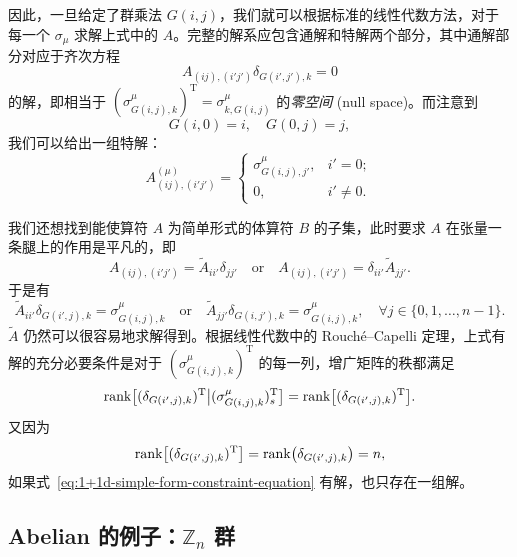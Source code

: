 因此，一旦给定了群乘法 $G(i,j)$，我们就可以根据标准的线性代数方法，对于每一个 $\sigma_\mu$ 求解上式中的 $A$。完整的解系应包含通解和特解两个部分，其中通解部分对应于齐次方程
\begin{equation}
  A_{(ij), (i'j')} \delta_{G(i',j'), k} = 0
\end{equation}
的解，即相当于 $(\sigma^\mu_{G(i,j),k})^{\mathrm{T}}=\sigma^\mu_{k,G(i,j)}$ 的\emph{零空间} (null space)。而注意到
\begin{equation}
  G(i,0) = i, \quad G(0,j) = j,
\end{equation}
我们可以给出一组特解：
\begin{equation}
  A^{(\mu)}_{(ij), (i'j')} = \begin{cases}
    \sigma^\mu_{G(i,j), j'}, & i' = 0; \\
    0, & i' \neq 0.
  \end{cases}
  \label{eq:1+1d-specific-solution}
\end{equation}

我们还想找到能使算符 $A$ 为简单形式的体算符 $B$ 的子集，此时要求 $A$ 在张量一条腿上的作用是平凡的，即
\begin{equation}
  A_{(ij), (i'j')} = \tilde{A}_{ii'} \delta_{jj'} \quad \text{or} \quad
  A_{(ij), (i'j')} = \delta_{ii'} \tilde{A}_{jj'}.
\end{equation}
于是有
\begin{equation}
  \tilde{A}_{ii'} \delta_{G(i',j), k} = \sigma^\mu_{G(i,j), k} \quad \text{or} \quad
  \tilde{A}_{jj'} \delta_{G(i,j'), k} = \sigma^\mu_{G(i,j), k}, \quad
  \forall j \in \{ 0, 1, \dots, n-1 \}.
  \label{eq:1+1d-simple-form-constraint-equation}
\end{equation}
$\tilde{A}$ 仍然可以很容易地求解得到。根据线性代数中的 Rouch\'e--Capelli 定理，上式有解的充分必要条件是对于 $(\sigma^\mu_{G(i,j),k})^{\mathrm{T}}$ 的每一列，增广矩阵的秩都满足
\begin{equation}
    \operatorname{rank}\bigl[ (\delta_{G(i',j), k})^{\mathrm{T}} \big| (\sigma^\mu_{G(i,j),k})^{\mathrm{T}}_s \bigr]
  = \operatorname{rank}\bigl[ (\delta_{G(i',j), k})^{\mathrm{T}} \bigr].
\end{equation}
又因为
\begin{equation}
    \operatorname{rank}\bigl[ (\delta_{G(i',j), k})^{\mathrm{T}} \bigr]
  = \operatorname{rank}\bigl( \delta_{G(i',j), k} \bigr) = n,
\end{equation}
如果式~\eqref{eq:1+1d-simple-form-constraint-equation} 有解，也只存在一组解。

\subsection{Abelian 的例子：\texorpdfstring{$\mathbb{Z}_n$}{ℤₙ} 群}

